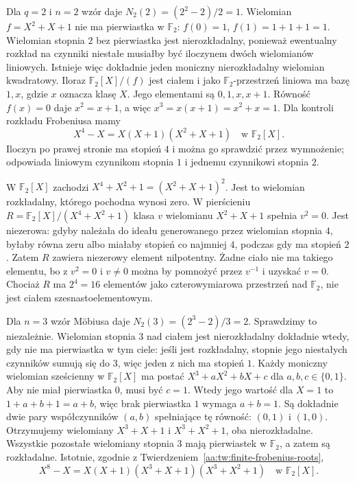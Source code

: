\begin{przyklad}
\label{aa:prz:finite-quadratic}
Dla $q=2$ i $n=2$ wzór daje
$N_2(2)=(2^2-2)/2=1$. Wielomian
$f=X^2+X+1$ nie ma pierwiastka w $\mathbb F_2$:
$f(0)=1$, $f(1)=1+1+1=1$.
Wielomian stopnia $2$ bez pierwiastka jest
nierozkładalny, ponieważ ewentualny rozkład na
czynniki niestałe musiałby być iloczynem dwóch
wielomianów liniowych. Istnieje więc dokładnie jeden
moniczny nierozkładalny wielomian kwadratowy.
Iloraz $\mathbb F_2[X]/(f)$ jest ciałem i jako
$\mathbb F_2$-przestrzeń liniowa ma bazę $1,x$,
gdzie $x$ oznacza klasę $X$. Jego elementami są
$0,1,x,x+1$. Równość $f(x)=0$ daje
$x^2=x+1$, a więc $x^3=x(x+1)=x^2+x=1$.
Dla kontroli rozkładu Frobeniusa mamy
\[
X^4-X=X(X+1)(X^2+X+1)
\quad\text{w }\mathbb F_2[X].
\]
Iloczyn po prawej stronie ma stopień $4$ i można go
sprawdzić przez wymnożenie; odpowiada liniowym
czynnikom stopnia $1$ i jednemu czynnikowi stopnia $2$.
\end{przyklad}

\begin{przyklad}
\label{aa:prz:finite-reducible}
W $\mathbb F_2[X]$ zachodzi
$X^4+X^2+1=(X^2+X+1)^2$. Jest to wielomian
rozkładalny, którego pochodna wynosi zero.
W pierścieniu
$R=\mathbb F_2[X]/(X^4+X^2+1)$
klasa $v$ wielomianu $X^2+X+1$ spełnia $v^2=0$.
Jest niezerowa: gdyby należała do ideału generowanego
przez wielomian stopnia $4$, byłaby równa zeru albo
miałaby stopień co najmniej $4$, podczas gdy ma stopień
$2$. Zatem $R$ zawiera niezerowy element nilpotentny.
Żadne ciało nie ma takiego elementu, bo z $v^2=0$
i $v\ne0$ można by pomnożyć przez $v^{-1}$ i uzyskać
$v=0$. Chociaż $R$ ma $2^4=16$ elementów jako
czterowymiarowa przestrzeń nad $\mathbb F_2$, nie jest
ciałem szesnastoelementowym.
\end{przyklad}

\begin{przyklad}
\label{aa:prz:finite-cubics}
Dla $n=3$ wzór Möbiusa daje
$N_2(3)=(2^3-2)/3=2$.
Sprawdzimy to niezależnie. Wielomian stopnia $3$
nad ciałem jest nierozkładalny dokładnie wtedy,
gdy nie ma pierwiastka w tym ciele: jeśli jest
rozkładalny, stopnie jego niestałych czynników sumują
się do $3$, więc jeden z nich ma stopień $1$.
Każdy moniczny wielomian sześcienny w $\mathbb F_2[X]$
ma postać $X^3+aX^2+bX+c$ dla $a,b,c\in\{0,1\}$.
Aby nie miał pierwiastka $0$, musi być $c=1$.
Wtedy jego wartość dla $X=1$ to
$1+a+b+1=a+b$, więc brak pierwiastka $1$ wymaga
$a+b=1$. Są dokładnie dwie pary współczynników
$(a,b)$ spełniające tę równość: $(0,1)$ i $(1,0)$.
Otrzymujemy wielomiany
$X^3+X+1$ i $X^3+X^2+1$, oba nierozkładalne.
Wszystkie pozostałe wielomiany stopnia $3$ mają
pierwiastek w $\mathbb F_2$, a zatem są rozkładalne.
Istotnie, zgodnie z Twierdzeniem~\ref{aa:tw:finite-frobenius-roots},
\[
X^8-X=X(X+1)(X^3+X+1)(X^3+X^2+1)
\quad\text{w }\mathbb F_2[X].
\]
\end{przyklad}

